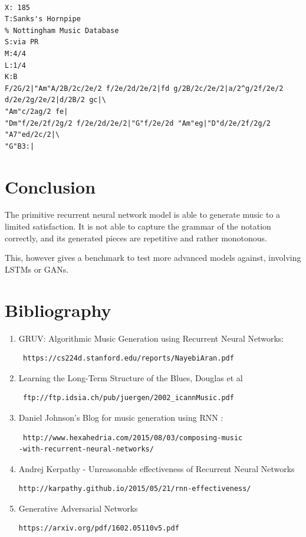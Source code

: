 \documentclass[11pt]{article}
\begin{document}
\begin{verbatim}

X: 185
T:Sanks's Hornpipe
% Nottingham Music Database
S:via PR
M:4/4
L:1/4
K:B
F/2G/2|"Am"A/2B/2c/2e/2 f/2e/2d/2e/2|fd g/2B/2c/2e/2|a/2^g/2f/2e/2 
d/2e/2g/2e/2|d/2B/2 gc|\
"Am"c/2ag/2 fe|
"Dm"f/2e/2f/2g/2 f/2e/2d/2e/2|"G"f/2e/2d "Am"eg|"D"d/2e/2f/2g/2 "A7"ed/2c/2|\
"G"B3:|

\end{verbatim}
\section{Conclusion}
The primitive recurrent neural network model is able to generate music to a limited satisfaction. It is not able to capture the grammar of the notation correctly, and its generated pieces are repetitive and rather monotonous.

This, however gives a benchmark to test more advanced models against, involving LSTMs or GANs.

\section{Bibliography}
\begin{enumerate}
\item GRUV: Algorithmic Music Generation using
Recurrent Neural Networks: 
\begin{verbatim} https://cs224d.stanford.edu/reports/NayebiAran.pdf
\end{verbatim}
\item Learning the Long-Term Structure of the Blues, Douglas et al 
\begin{verbatim} ftp://ftp.idsia.ch/pub/juergen/2002_icannMusic.pdf

\end{verbatim}
\item Daniel Johnson's Blog for music generation using RNN :
\begin{verbatim} http://www.hexahedria.com/2015/08/03/composing-music
-with-recurrent-neural-networks/

\end{verbatim}
\item Andrej Kerpathy - Unreasonable effectiveness of Recurrent Neural Networks 
\begin{verbatim}http://karpathy.github.io/2015/05/21/rnn-effectiveness/

\end{verbatim}
\item Generative Adversarial Networks 
\begin{verbatim}https://arxiv.org/pdf/1602.05110v5.pdf

\end{verbatim}
\end{enumerate}
\end{document}
